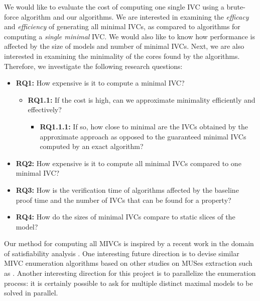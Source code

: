 We would like to evaluate the cost of computing one single IVC using a brute-force
algorithm and our algorithms. We are interested in examining the {\em efficacy} and {\em efficiency} of generating all minimal IVCs, as compared to algorithms for computing a {\em single minimal} IVC.  We would also like to know how performance is affected by the size of models and number of minimal IVCs.  Next, we are also interested in examining the minimality of the cores found by the algorithms.  %
%
%
Therefore, we investigate the following research questions:
\begin{itemize}
\item \textbf{RQ1:} How expensive is it to compute a minimal IVC?
\begin{itemize}
  \item \textbf{RQ1.1:} If the cost is high, can we approximate minimality efficiently and effectively?
   \begin{itemize}
    \item \textbf{RQ1.1.1:} If so, how close to minimal are the IVCs obtained by the approximate approach as opposed to the guaranteed minimal IVCs computed by an exact algorithm?
  \end{itemize}
\end{itemize}
  \item \textbf{RQ2:} How expensive is it to compute all minimal IVCs compared to one minimal IVC?
  \item \textbf{RQ3:} How is the verification time of algorithms affected by the baseline proof time and the number of IVCs that can be found for a property?
   \item \textbf{RQ4:} How do the sizes of minimal IVCs compare to static slices of the model?
\end{itemize}

Our method for computing all MIVCs is inspired by a recent work in the domain of satisfiability analysis \cite{marco2016fast}. One interesting future direction is to devise similar MIVC enumeration algorithms based on other studies on MUSes extraction such as \cite{nadel2014accelerated}.
Another interesting direction for this project is to parallelize the enumeration process: it is certainly possible to ask for multiple distinct maximal models to be solved in parallel.

